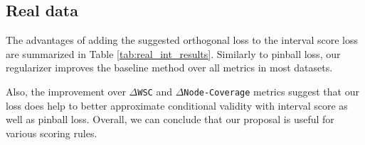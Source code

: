 \documentclass{article}
\begin{document}
\begin{appendices}
\begin{table}[htbp]
{\begin{tabular}{cccccccccccc}
    \bottomrule[1.1pt]

    \end{tabular}%
    }
  \label{tab:syn_int_table}%
\end{table}%



\subsection{Real data}\label{real_int_results}

The advantages of adding the suggested orthogonal loss to the interval score loss are summarized in Table \ref{tab:real_int_results}. Similarly to pinball loss, our regularizer improves the baseline method over all metrics in most datasets.

Also, the improvement over $\Delta$\texttt{WSC} and $\Delta$\texttt{Node-Coverage} metrics suggest that our loss does help to better approximate conditional validity with interval score as well as pinball loss. Overall, we can conclude that our proposal is useful for various scoring rules.




\begin{table}[htbp]
  \centering
  \caption{Real data experiments - using interval score loss with either \texttt{QR} (baseline) or \texttt{orthogonal QR} (\texttt{OQR}) with penalty term $\mathcal{R}_{\textrm{corr}}$. Refer to the caption of Table~\ref{tab:real_pinball_results} for further details. The standard errors for coverage and width are about 0.6, 0.1, respectively. See Table~\ref{tab:real_int_std_errs} for a full reporting of all standard errors.}
\end{table}
\end{appendices}
\end{document}
